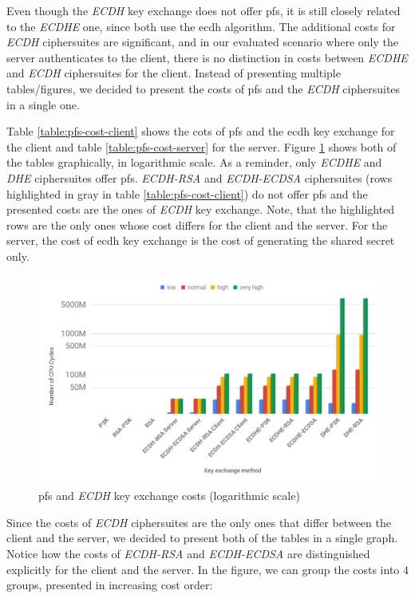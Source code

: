 Even though the \textit{ECDH} key exchange does not offer \gls{pfs}, it is still closely related to the \textit{ECDHE} one, since both use
the \gls{ecdh} algorithm. The additional costs for \textit{ECDH} ciphersuites are significant, and in our evaluated scenario where only the server
authenticates to the client, there is no distinction in costs between \textit{ECDHE} and \textit{ECDH} ciphersuites for the client. Instead of
presenting multiple tables/figures, we decided to present the costs of \gls{pfs} and the \textit{ECDH} ciphersuites in a single one.

Table \ref{table:pfs-cost-client} shows the cots of \gls{pfs} and the \gls{ecdh} key exchange for the client and table \ref{table:pfs-cost-server}
for the server. Figure \ref{fig:pfs-cost-all-sls} shows both of the tables graphically, in logarithmic scale. As a reminder, only \textit{ECDHE} and \textit{DHE} ciphersuites offer \gls{pfs}. \textit{ECDH-RSA} and \textit{ECDH-ECDSA}
ciphersuites (rows highlighted in gray in table \ref{table:pfs-cost-client}) do not offer \gls{pfs} and the presented costs are the ones of \textit{ECDH} key exchange. Note, that the
highlighted rows are the only ones whose cost differs for
the client and the server. For the server, the cost of \gls{ecdh} key exchange is the cost of generating the shared secret only.

\begin{figure}
  \centering
  \includegraphics[width=1.0\textwidth]{img/pfs_cost_all_sls.png}
  \centering \caption{\label{fig:pfs-cost-all-sls} \gls{pfs} and \textit{ECDH} key exchange costs (logarithmic scale)}
\end{figure}

 Since the costs
of \textit{ECDH} ciphersuites are the only ones that differ between the client and the server, we decided to present both of the tables in a
single graph. Notice how the costs of \textit{ECDH-RSA} and \textit{ECDH-ECDSA} are distinguished explicitly for the client and the server.
In the figure, we can group the costs into $4$ groups, presented in increasing cost order:

